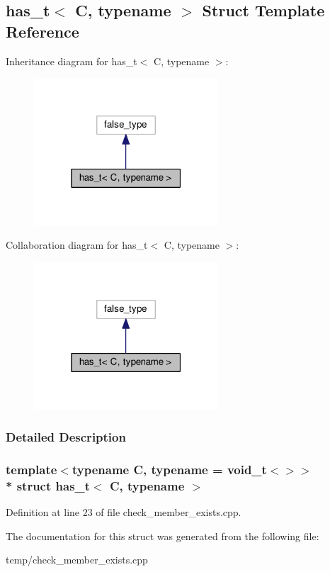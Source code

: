 \hypertarget{structhas__t}{}\subsection{has\+\_\+t$<$ C, typename $>$ Struct Template Reference}
\label{structhas__t}


Inheritance diagram for has\+\_\+t$<$ C, typename $>$\+:\nopagebreak
\begin{figure}[H]
\begin{center}
\leavevmode
\includegraphics[width=195pt]{structhas__t__inherit__graph}
\end{center}
\end{figure}


Collaboration diagram for has\+\_\+t$<$ C, typename $>$\+:\nopagebreak
\begin{figure}[H]
\begin{center}
\leavevmode
\includegraphics[width=195pt]{structhas__t__coll__graph}
\end{center}
\end{figure}


\subsubsection{Detailed Description}
\subsubsection*{template$<$typename C, typename = void\+\_\+t$<$$>$$>$\\*
struct has\+\_\+t$<$ C, typename $>$}



Definition at line 23 of file check\+\_\+member\+\_\+exists.\+cpp.



The documentation for this struct was generated from the following file\+:\begin{DoxyCompactItemize}
\item 
temp/check\+\_\+member\+\_\+exists.\+cpp\end{DoxyCompactItemize}
